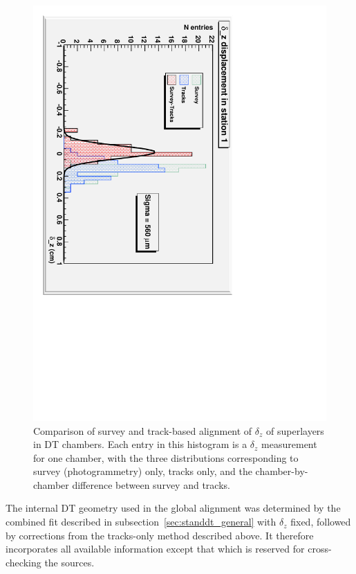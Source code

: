\begin{figure}
  \begin{center}
  \includegraphics[height=\linewidth, angle=90]{plots/standalone_dt_alignment/DiffereceancesAllSurveyTracksST1.pdf}
  \end{center}
  \caption{Comparison of survey and track-based alignment of $\delta_z$ of superlayers in DT chambers.  Each entry in this histogram is a $\delta_z$ measurement for one chamber, with the three distributions corresponding to survey (photogrammetry) only, tracks only, and the chamber-by-chamber difference between survey and tracks. \label{fig:surveyvstracks}}
\end{figure}

The internal DT geometry used in the global alignment was determined
by the combined fit described in subsection~\ref{sec:standdt_general}
with $\delta_z$ fixed, followed by corrections from the tracks-only
method described above.  It therefore incorporates all available
information except that which is reserved for cross-checking the
sources.
